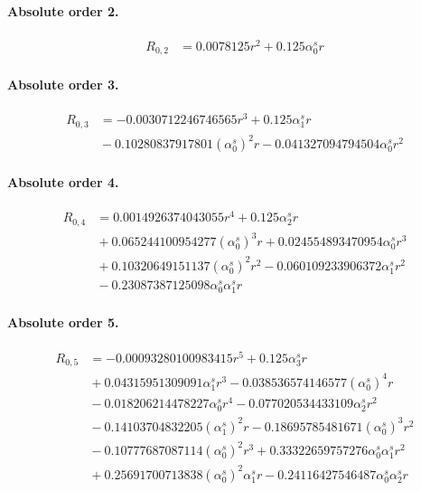 \documentclass[10pt]{article}
\begin{document}
\paragraph{Absolute order 2.}
\begin{align*}
R_{0,2} &= 0.0078125 r^{2} + 0.125 \alpha_{0}^s r
\end{align*}

\paragraph{Absolute order 3.}
\begin{align*}
R_{0,3} &=  - 0.0030712246746565 r^{3} + 0.125 \alpha_{1}^s r \\
&{}  - 0.10280837917801 \left(\alpha_{0}^s\right)^{2} r - 0.041327094794504 \alpha_{0}^s r^{2}
\end{align*}

\paragraph{Absolute order 4.}
\begin{align*}
R_{0,4} &= 0.0014926374043055 r^{4} + 0.125 \alpha_{2}^s r \\
&{}  + 0.065244100954277 \left(\alpha_{0}^s\right)^{3} r + 0.024554893470954 \alpha_{0}^s r^{3} \\
&{}  + 0.10320649151137 \left(\alpha_{0}^s\right)^{2} r^{2} - 0.060109233906372 \alpha_{1}^s r^{2} \\
&{}  - 0.23087387125098 \alpha_{0}^s \alpha_{1}^s r
\end{align*}

\paragraph{Absolute order 5.}
\begin{align*}
R_{0,5} &=  - 0.00093280100983415 r^{5} + 0.125 \alpha_{3}^s r \\
&{}  + 0.04315951309091 \alpha_{1}^s r^{3} - 0.038536574146577 \left(\alpha_{0}^s\right)^{4} r \\
&{}  - 0.018206214478227 \alpha_{0}^s r^{4} - 0.077020534433109 \alpha_{2}^s r^{2} \\
&{}  - 0.14103704832205 \left(\alpha_{1}^s\right)^{2} r - 0.18695785481671 \left(\alpha_{0}^s\right)^{3} r^{2} \\
&{}  - 0.10777687087114 \left(\alpha_{0}^s\right)^{2} r^{3} + 0.33322659757276 \alpha_{0}^s \alpha_{1}^s r^{2} \\
&{}  + 0.25691700713838 \left(\alpha_{0}^s\right)^{2} \alpha_{1}^s r - 0.24116427546487 \alpha_{0}^s \alpha_{2}^s r
\end{align*}
\end{document}
